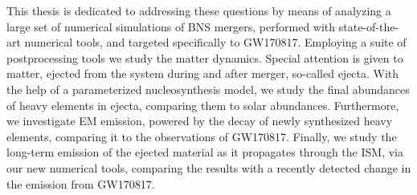 \documentclass[
openright,
12pt, %
english,%
onehalfspacing, %
nolistspacing, %
nohyperref, %
headsepline, %
]{MastersDoctoralThesis} %
\newcommand{\GW}{GW170817}
\newcommand{\pmerg}{post-merger}
\newcommand{\nuc}{nucleosynthesis}
\begin{document}
    This thesis is dedicated to addressing these questions by means of analyzing a 
    large set of numerical simulations of \ac{BNS} mergers, performed with state-of-the-art 
    numerical tools, and targeted specifically to \GW{}. 
    Employing a suite of postprocessing tools we study the matter dynamics.
    Special attention is given to matter, ejected from the system during and after merger, so-called ejecta.  
    With the help of a parameterized 
    \nuc{} model, we study the final abundances of heavy elements in ejecta, 
    comparing them to solar abundances. 
    Furthermore, we investigate \ac{EM} emission, 
    powered by the decay of newly synthesized heavy elements, 
    comparing it to the observations of \GW{}. 
    Finally, we study the long-term emission of the ejected 
    material as it propagates through the \ac{ISM}, via our new numerical tools, 
    comparing the results with a recently detected change in the emission from \GW{}.
    
    
    




\makeatletter
\renewcommand\@biblabel[1]{}
\makeatother

\begingroup
\def\refname{Published content and contributions}
\def\bibname{Published content and contributions}

\endgroup



\end{document}

